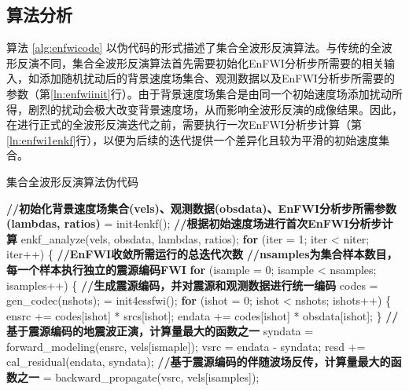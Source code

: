 \subsection{算法分析}
算法 \ref{alg:enfwicode} 以伪代码的形式描述了集合全波形反演算法。与传统的全波形反演不同，集合全波形反演算法首先需要初始化EnFWI分析步所需要的相关输入，如添加随机扰动后的背景速度场集合、观测数据以及EnFWI分析步所需要的参数（第\ref{ln:enfwiinit}行）。由于背景速度场集合是由同一个初始速度场添加扰动所得，剧烈的扰动会极大改变背景速度场，从而影响全波形反演的成像结果。因此，在进行正式的全波形反演迭代之前，需要执行一次EnFWI分析步计算（第\ref{ln:enfwi1enkf}行），以便为后续的迭代提供一个差异化且较为平滑的初始速度集合。

\begin{algorithm}[ht]
\small
\caption{集合全波形反演算法伪代码}\label{alg:enfwicode}
\begin{algorithmic}[1]
\State \textbf{//初始化背景速度场集合(vels)、观测数据(obsdata)、EnFWI分析步所需参数(lambdas, ratios)}
 = init4enkf(); \label{ln:enfwiinit}
\State
\State \textbf{//根据初始速度场进行首次EnFWI分析步计算}
\State enkf\_analyze(vels, obsdata, lambdas, ratios); \label{ln:enfwi1enkf}
\State
\State \textbf{for} (iter = 1; iter < niter; iter++) \{ \textbf{//EnFWI收敛所需运行的总迭代次数} \label{ln:enfwiiter}
\State
\State \quad\quad \textbf{//nsamples为集合样本数目，每一个样本执行独立的震源编码FWI}
\State \quad\quad \textbf{for} (isample = 0; isample < nsamples; isamples++) \{ \label{ln:enfwisample}
\State \quad\quad\quad\quad \textbf{//生成震源编码，并对震源和观测数据进行统一编码}
\State \quad\quad\quad\quad codes = gen\_codec(nshots); \label{ln:enfwicodec}
\State \quad\quad\quad{} = init4essfwi();
\State \quad\quad\quad\quad \textbf{for} (ishot = 0; ishot < nshots; ishots++) \{
\State \quad\quad\quad\quad\quad\quad ensrc += codes[ishot] * srcs[ishot];
\State \quad\quad\quad\quad\quad\quad endata += codes[ishot] * obsdata[ishot];
\State \quad\quad\quad\quad \} \label{ln:enfwicodecend}
\State
\State \quad\quad\quad\quad \textbf{//基于震源编码的地震波正演，计算量最大的函数之一}
\State \quad\quad\quad\quad syndata = forward\_modeling(ensrc, vels[ismaple]); \label{ln:enfwiforward}
\State \quad\quad\quad\quad vsrc = endata - syndata; \label{ln:vsrc}
\State \quad\quad\quad\quad resd += cal\_residual(endata, syndata); \label{ln:resd}
\State
\State \quad\quad\quad\quad \textbf{//基于震源编码的伴随波场反传，计算量最大的函数之一}
\State \quad\quad\quad{} = backward\_propagate(vsrc, vels[isamples]); \label{ln:enfwibackward}

\end{algorithmic}
\end{algorithm}
